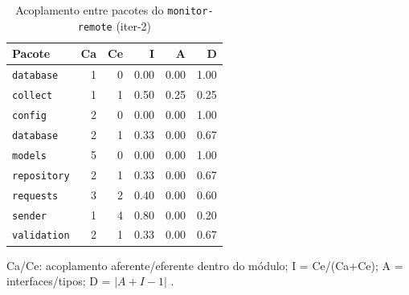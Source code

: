 \begin{table}[htbp]
  \centering\small
  \caption{Acoplamento entre pacotes do \texttt{monitor-remote} (iter-2)}
  \label{tab:iter-2-acoplamento-remote}
  \begin{tabular}{lrrrrr}
    \toprule
    Pacote & Ca & Ce & I & A & D \\
    \midrule
    \texttt{database} & 1 & 0 & 0.00 & 0.00 & 1.00 \\
    \texttt{collect} & 1 & 1 & 0.50 & 0.25 & 0.25 \\
    \texttt{config} & 2 & 0 & 0.00 & 0.00 & 1.00 \\
    \texttt{database} & 2 & 1 & 0.33 & 0.00 & 0.67 \\
    \texttt{models} & 5 & 0 & 0.00 & 0.00 & 1.00 \\
    \texttt{repository} & 2 & 1 & 0.33 & 0.00 & 0.67 \\
    \texttt{requests} & 3 & 2 & 0.40 & 0.00 & 0.60 \\
    \texttt{sender} & 1 & 4 & 0.80 & 0.00 & 0.20 \\
    \texttt{validation} & 2 & 1 & 0.33 & 0.00 & 0.67 \\
    \bottomrule
  \end{tabular}
  \par\smallskip\footnotesize Ca/Ce: acoplamento aferente/eferente dentro do módulo; I = Ce/(Ca+Ce); A = interfaces/tipos; D = $|A+I-1|$ \cite{martin2002}.
\end{table}

